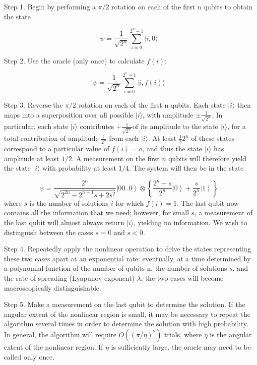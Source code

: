 \documentclass[12pt]{article}
\begin{document}
Step 1. Begin by performing a $\pi/2$ rotation on each of the first n qubits
to obtain the state%

\begin{equation}
\psi=\frac{1}{\sqrt{2^{n}}}\sum\limits_{i=0}^{2^{n}-1}|i,0\rangle
\end{equation}

Step 2. Use the oracle (only once) to calculate $f(i)$:%

\begin{equation}
\psi=\frac{1}{\sqrt{2^{n}}}\sum\limits_{i=0}^{2^{n}-1}|i,f(i)\rangle
\end{equation}

Step 3. Reverse the $\pi/2$ rotation on each of the first n qubits. Each
state $\vert i \rangle$ then maps into a superposition over all possible
$\vert i \rangle$, with amplitude $\pm\frac{1}{\sqrt{2^{n}}}$. In particular, each state
$\vert i \rangle$ contributes $+\frac{1}{\sqrt{2^{n}}}$of its amplitude to the state
$\vert i \rangle$, for a total contribution of amplitude $\frac{1}{2^{n}}$ from each
$\vert i \rangle$. At least $\frac{1}{2}2^{n}$ of these states correspond to a particular value
of $f(i)=a$, and thus the state
$\vert i \rangle$
has amplitude at least $1/2$. A measurement on the first $n$ qubits will therefore
yield the state
$\vert i \rangle$
with probability at least $1/4$. The system will then be in the state%

\begin{equation}
\psi=\frac{2^{n}}{\sqrt{2^{2n}-2^{n+1}s+2s^{2}}}\left|  00..0\right\rangle
\otimes\left\{  \frac{2^{n}-s}{2^{n}}\left|  0\right\rangle +\frac{s}{2^{n}%
}\left|  1\right\rangle \right\}
\end{equation}
where $s$ is the number of solutions $i$ for which $f(i)=1$. The last qubit now
contains all the information that we need; however, for small $s$, a measurement
of the last qubit will almost always return $\vert i \rangle$, yielding no information. 
We wish to distinguish between the cases $s=0$ and $s<0$.

Step 4. Repeatedly apply the nonlinear operation to drive the states
representing these two cases apart at an exponential rate: eventually, at a
time determined by a polynomial function of the number of qubits n, the number
of solutions $s$, and the rate of spreading (Lyapunov exponent) $\lambda$, the
two cases will become macroscopically distinguishable.

Step 5. Make a measurement on the last qubit to determine the solution. If the
angular extent of the nonlinear region is small, it may be necessary to repeat
the algorithm several times in order to determine the solution with high
probability. In general, the algorithm will require $O((\pi/\eta)^{2})$
trials, where $\eta$ is the angular extent of the nonlinear region. If $\eta$
is sufficiently large, the oracle may need to be called only once.
\end{document}
